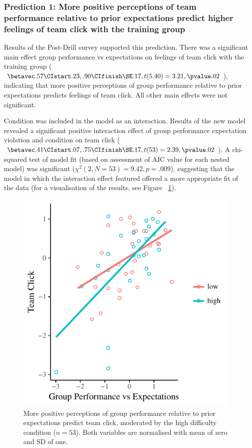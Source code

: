 





\subsubsection{Prediction 1: More positive perceptions of team performance relative to prior expectations predict higher feelings of team click with the training group}


Results of the Post-Drill survey supported this prediction. There was a significant main effect group performance vs expectations on feelings of team click with the training group ($\betavec .57 \CIstart .23, .90 \CIfinish \SE .17, t(5.40) = 3.21, \pvalue .02$), indicating that more positive perceptions of group performance relative to prior expectations predicts feelings of team click.  All other main effects were not significant.

Condition was included in the model as an interaction.  Results of the new model revealed a significant positive interaction effect of group performance expectation violation and condition on team click ($\betavec .41 \CIstart .07, .75 \CIfinish \SE .17, t(53) = 2.39, \pvalue .02 $).  A chi-squared test of model fit (based on assessment of AIC value for each nested model) was significant ($\chi^2 (2, N = 53) = 9.42, p = .009$), suggesting that the model in which the interaction effect featured offered a more appropriate fit of the data (for a visualisation of the results, see Figure ~\ref{fig:teamPerfExpClickScatter}).

\begin{figure}
    \centering
    \includegraphics[width=0.5\linewidth,keepaspectratio] {images/teamPerfExpClickScatter-1}
    \caption{More positive perceptions of group performance relative to prior expectations predict team click, moderated by the high difficulty condition  ($n = 53$).  Both  variables are normalised with mean of zero and SD of one.}
    \label{fig:teamPerfExpClickScatter}
\end{figure}

